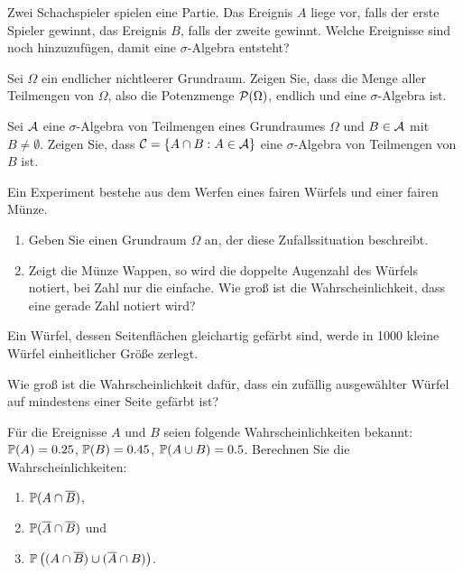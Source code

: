  Zwei Schachspieler spielen eine
Partie. Das Ereignis $A$ liege vor, falls der erste Spieler gewinnt, das
Ereignis $B$, falls der zweite gewinnt. Welche Ereignisse sind noch
hinzuzufügen, damit eine $\sigma$-Algebra entsteht?

Sei $\Omega$ ein endlicher nichtleerer Grundraum. Zeigen Sie, dass die
Menge aller Teilmengen von $\Omega$, also die Potenzmenge $\mathcal P(\Omega)$,
endlich und eine $\sigma$-Algebra ist.

Sei $\mathcal A$ eine $\sigma$-Algebra von Teilmengen eines Grundraumes $\Omega$ und
$B \in \mathcal A$ mit $B\neq \emptyset$. Zeigen Sie, dass $\mathcal C = \left\{ A\cap B :
A\in\mathcal A \right\}$ eine $\sigma$-Algebra von Teilmengen von $B$ ist.

Ein Experiment bestehe aus dem Werfen eines fairen Würfels und einer fairen Münze.
\begin{enumerate}
    \item Geben Sie einen Grundraum $\Omega$ an, der diese Zufallssituation beschreibt.
    \item Zeigt die Münze Wappen, so wird die doppelte Augenzahl des Würfels
        notiert, bei Zahl nur die einfache. Wie groß ist die
        Wahrscheinlichkeit, dass eine gerade Zahl notiert wird?
\end{enumerate}


Ein Würfel, dessen Seitenflächen gleichartig gefärbt sind, werde in 1000
kleine Würfel einheitlicher Größe zerlegt.

Wie groß ist die Wahrscheinlichkeit dafür, dass ein zufällig ausgewählter
Würfel auf mindestens einer Seite gefärbt ist?


Für die Ereignisse $A$ und $B$ seien folgende Wahrscheinlichkeiten bekannt:
$\mathbb P(A)=0.25$, $\mathbb P(B)=0.45$, $\mathbb P(A\cup B)=0.5$. Berechnen Sie die
Wahrscheinlichkeiten:
\begin{enumerate}
    \item $\mathbb P(A\cap\overline{B})$,
    \item $\mathbb P(\overline{A}\cap\overline{B})$ und
    \item $\mathbb P\left((A\cap\overline{B})\cup(\overline{A}\cap B)\right)$.
\end{enumerate}

